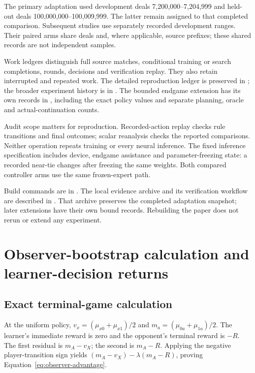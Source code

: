 \documentclass[11pt]{article}
\begin{document}
The primary adaptation used development deals 7,200,000--7,204,999 and held-out
deals 100,000,000--100,009,999. The latter remain assigned to that completed
comparison. Subsequent studies use separately recorded development ranges.
Their paired arms share deals and, where applicable, source prefixes; these
shared records are not independent samples.

Work ledgers distinguish full source matches, conditional training or search
completions, rounds, decisions and verification replay. They also retain
interrupted and repeated work. The detailed reproduction ledger is preserved
in ; the broader experiment history is
in . The bounded endgame extension has its own records
in , including the exact policy values
and separate planning, oracle and actual-continuation counts.

Audit scope matters for reproduction. Recorded-action replay checks rule
transitions and final outcomes; scalar reanalysis checks the reported
comparisons. Neither operation repeats training or every neural inference.
The fixed inference specification includes device, endgame assistance and
parameter-freezing state: a recorded near-tie changes after freezing the same
weights. Both compared controller arms use the same frozen-expert path.

Build commands are in . The local evidence archive
and its verification workflow are described in .
That archive preserves the completed adaptation snapshot; later extensions
have their own bound records. Rebuilding the paper does not rerun or extend
any experiment.








\section{Observer-bootstrap calculation and learner-decision returns}
\label{app:observer}
\subsection{Exact terminal-game calculation}
At the uniform policy, $v_x=(\mu_{x0}+\mu_{x1})/2$ and
$m_a=(\mu_{0a}+\mu_{1a})/2$. The learner's immediate reward is zero and the
opponent's terminal reward is $-R$. The first residual is $m_A-v_X$; the second
is $m_A-R$. Applying the negative player-transition sign yields
$(m_A-v_X)-\lambda(m_A-R)$, proving
Equation~\ref{eq:observer-advantage}.
\end{document}
